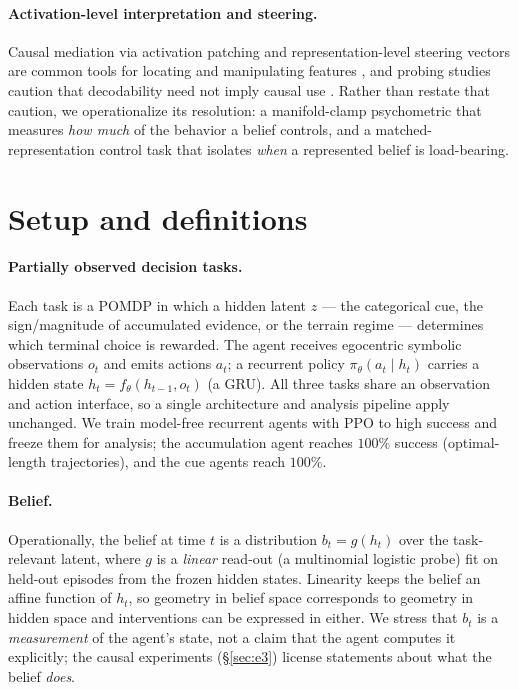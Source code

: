 \documentclass[11pt]{article}
\begin{document}
\paragraph{Activation-level interpretation and steering.} Causal mediation via
activation patching and representation-level steering vectors are common tools for
locating and manipulating features \citep{meng2022locating, turner2023activation,
zou2023representation}, and probing studies caution that decodability need not
imply causal use \citep{ravichander2021probing}. Rather than restate that caution,
we operationalize its resolution: a manifold-clamp psychometric that measures
\emph{how much} of the behavior a belief controls, and a matched-representation
control task that isolates \emph{when} a represented belief is load-bearing.

\section{Setup and definitions}
\label{sec:setup}

\paragraph{Partially observed decision tasks.} Each task is a POMDP in which a
hidden latent $z$ --- the categorical cue, the sign/magnitude of accumulated
evidence, or the terrain regime --- determines which terminal choice is rewarded.
The agent receives egocentric symbolic observations $o_t$ and emits actions
$a_t$; a recurrent policy $\pi_\theta(a_t \mid h_t)$ carries a hidden state
$h_t = f_\theta(h_{t-1}, o_t)$ (a GRU). All three tasks share an observation and
action interface, so a single architecture and analysis pipeline apply unchanged.
We train model-free recurrent agents with PPO \citep{schulman2017proximal} to high
success and freeze them for analysis; the accumulation agent reaches $100\%$
success (optimal-length trajectories), and the cue agents reach $100\%$.

\paragraph{Belief.} Operationally, the belief at time $t$ is a distribution
$b_t = g(h_t)$ over the task-relevant latent, where $g$ is a \emph{linear} read-out
(a multinomial logistic probe) fit on held-out episodes from the frozen hidden
states. Linearity keeps the belief an affine function of $h_t$, so geometry in
belief space corresponds to geometry in hidden space and interventions can be
expressed in either. We stress that $b_t$ is a \emph{measurement} of the agent's
state, not a claim that the agent computes it explicitly; the causal experiments
(\S\ref{sec:e3}) license statements about what the belief \emph{does}.
\end{document}
